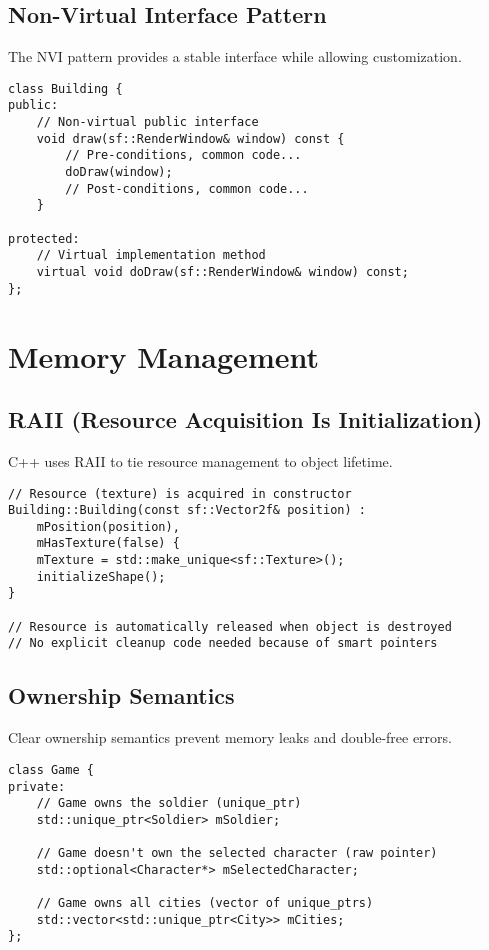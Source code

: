 \documentclass{article}
\begin{document}
\subsection{Non-Virtual Interface Pattern}

The NVI pattern provides a stable interface while allowing customization.

\begin{lstlisting}[caption=NVI Pattern Example]
class Building {
public:
    // Non-virtual public interface
    void draw(sf::RenderWindow& window) const {
        // Pre-conditions, common code...
        doDraw(window);
        // Post-conditions, common code...
    }
    
protected:
    // Virtual implementation method
    virtual void doDraw(sf::RenderWindow& window) const;
};
\end{lstlisting}

\section{Memory Management}

\subsection{RAII (Resource Acquisition Is Initialization)}

C++ uses RAII to tie resource management to object lifetime.

\begin{lstlisting}[caption=RAII Example]
// Resource (texture) is acquired in constructor
Building::Building(const sf::Vector2f& position) : 
    mPosition(position), 
    mHasTexture(false) {
    mTexture = std::make_unique<sf::Texture>();
    initializeShape();
}

// Resource is automatically released when object is destroyed
// No explicit cleanup code needed because of smart pointers
\end{lstlisting}

\subsection{Ownership Semantics}

Clear ownership semantics prevent memory leaks and double-free errors.

\begin{lstlisting}[caption=Ownership Example (Game.h)]
class Game {
private:
    // Game owns the soldier (unique_ptr)
    std::unique_ptr<Soldier> mSoldier;
    
    // Game doesn't own the selected character (raw pointer)
    std::optional<Character*> mSelectedCharacter;
    
    // Game owns all cities (vector of unique_ptrs)
    std::vector<std::unique_ptr<City>> mCities;
};
\end{lstlisting}
\end{document}
